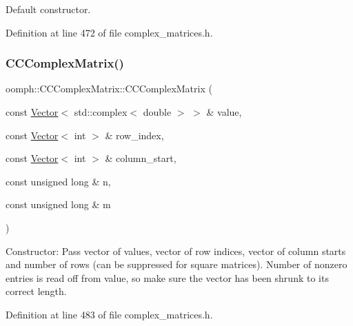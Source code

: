 Default constructor. 



Definition at line 472 of file complex\+\_\+matrices.\+h.

\mbox{\label{classoomph_1_1CCComplexMatrix_a3b354aedafe10d75bda23ce1e34e2971}} 
\subsubsection{\texorpdfstring{C\+C\+Complex\+Matrix()}{CCComplexMatrix()}\hspace{0.1cm}{\footnotesize\ttfamily [2/3]}}
{\footnotesize\ttfamily oomph\+::\+C\+C\+Complex\+Matrix\+::\+C\+C\+Complex\+Matrix (\begin{DoxyParamCaption}\item[{const \hyperlink{classoomph_1_1Vector}{Vector}$<$ std\+::complex$<$ double $>$ $>$ \&}]{value,  }\item[{const \hyperlink{classoomph_1_1Vector}{Vector}$<$ int $>$ \&}]{row\+\_\+index,  }\item[{const \hyperlink{classoomph_1_1Vector}{Vector}$<$ int $>$ \&}]{column\+\_\+start,  }\item[{const unsigned long \&}]{n,  }\item[{const unsigned long \&}]{m }\end{DoxyParamCaption})\hspace{0.3cm}{\ttfamily [inline]}}



Constructor\+: Pass vector of values, vector of row indices, vector of column starts and number of rows (can be suppressed for square matrices). Number of nonzero entries is read off from value, so make sure the vector has been shrunk to its correct length. 



Definition at line 483 of file complex\+\_\+matrices.\+h.

\mbox{\label{classoomph_1_1CCComplexMatrix_aee92c78d8715e0221d8db215609e7c3c}} 
